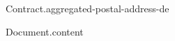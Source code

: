 \documentclass[
	version=last,
	fontsize=10pt,
	fromlogo=true,
	refline=wide,
	fromaddress=false,
	enlargefirstpage=true,
	numericaldate=false
]{scrlttr2}
\begin{document}
	\begin{letter}{{{Contract.aggregated-postal-address-de}}}

		{{Document.content}}

	\end{letter}
\end{document}
